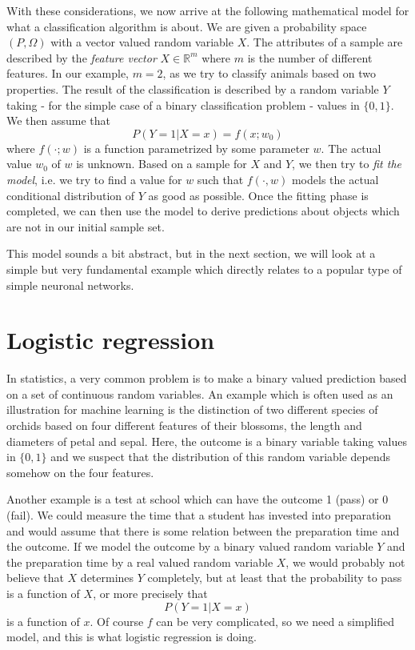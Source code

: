 \documentclass[a4paper, draft]{report}
\numberwithin{section}{chapter}
\numberwithin{equation}{chapter}
\theoremstyle{own}
\theoremstyle{remark}
\newcommand{\R}{\mathbb{R}}
\begin{document}
With these considerations, we now arrive at the following mathematical model for what a classification algorithm is about. We are given a probability space $(P, \Omega)$ with a vector valued random variable $X$. The attributes of a sample are described by the {\em feature vector} $X \in \R^m$ where $m$ is the number of different features. In our example, $m=2$, as we try to classify animals based on two properties. The result of the classification is described by a random variable $Y$ taking - for the simple case of a binary classification problem - values in 
$\{0,1\}$. We then assume that
$$
P(Y =1 | X=x) = f(x;w_0)
$$
where $f(\cdot;w)$ is a function parametrized by some parameter $w$. The actual value $w_0$ of $w$ is unknown. Based on a sample for $X$ and $Y$, we then try to {\em fit the model}, i.e. we try to find a value for $w$ such that $f(\cdot, w)$ models the actual conditional distribution of $Y$ as good as possible. Once the fitting phase is completed, we can then use the model to derive predictions about objects which are not in our initial sample set. 

This model sounds a bit abstract, but in the next section, we will look at a simple but very fundamental example which directly relates to a popular type of simple neuronal networks.

\chapter{Logistic regression}
\label{sec:logisticregression}

In statistics, a very common problem is to make a binary valued prediction based on a set of continuous random variables. An example which is often used as an illustration for machine learning is the distinction of two different species of orchids based on four different features of their blossoms, the length and diameters of petal and sepal. Here, the outcome is a binary variable taking values in $\{0,1\}$ and we suspect that the distribution of this random variable depends somehow on the four features. 

Another example is a test at school which can have the outcome 1 (pass) or 0 (fail). We could measure the time that a student has invested into preparation and would assume that there is some relation between the preparation time and the outcome. If we model the outcome by a binary valued random variable $Y$ and the preparation time by a real valued random variable $X$, we would probably not believe that $X$ determines $Y$ completely, but at least that the probability to pass is a function of $X$, or more precisely that
$$
P(Y=1 | X = x)
$$
is a function of $x$. Of course $f$ can be very complicated, so we need a simplified model, and this is what logistic regression is doing.
\end{document}
